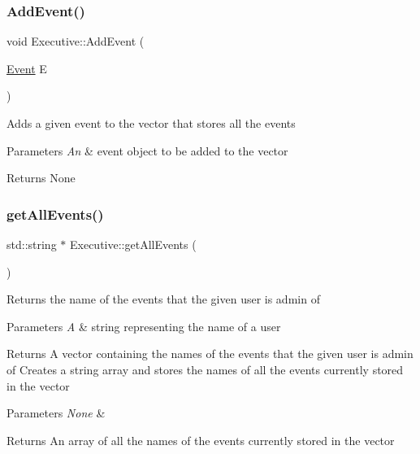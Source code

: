 \subsubsection{\texorpdfstring{Add\+Event()}{AddEvent()}}
{\footnotesize\ttfamily void Executive\+::\+Add\+Event (\begin{DoxyParamCaption}\item[{\mbox{\hyperlink{class_event}{Event}}}]{E }\end{DoxyParamCaption})}

Adds a given event to the vector that stores all the events 
\begin{DoxyParams}{Parameters}
{\em An} & event object to be added to the vector \\
\hline
\end{DoxyParams}
\begin{DoxyReturn}{Returns}
None 
\end{DoxyReturn}
\mbox{\label{class_executive_a55055e17ac87cc21a81ce4e15fe7cf50}} 
\subsubsection{\texorpdfstring{get\+All\+Events()}{getAllEvents()}}
{\footnotesize\ttfamily std\+::string $\ast$ Executive\+::get\+All\+Events (\begin{DoxyParamCaption}{ }\end{DoxyParamCaption})}

Returns the name of the events that the given user is admin of 
\begin{DoxyParams}{Parameters}
{\em A} & string representing the name of a user \\
\hline
\end{DoxyParams}
\begin{DoxyReturn}{Returns}
A vector containing the names of the events that the given user is admin of Creates a string array and stores the names of all the events currently stored in the vector 
\end{DoxyReturn}

\begin{DoxyParams}{Parameters}
{\em None} & \\
\hline
\end{DoxyParams}
\begin{DoxyReturn}{Returns}
An array of all the names of the events currently stored in the vector 
\end{DoxyReturn}
\mbox{\label{class_executive_a325d611b8cd579647ee657c69560f28a}} 
